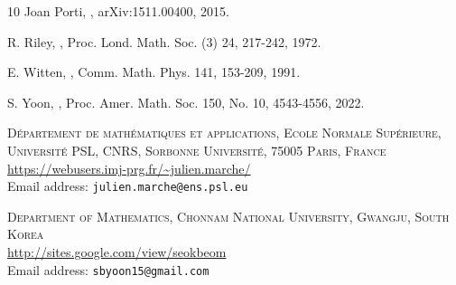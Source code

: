 \documentclass{amsart}
\theoremstyle{definition}
\begin{document}
\begin{thebibliography}{10}
Joan Porti,
,
\newblock arXiv:1511.00400, 2015.

R. Riley,
,
\newblock Proc. Lond. Math. Soc. (3) 24, 217-242, 1972.


E. Witten,
,
\newblock Comm. Math.  Phys. 141, 153-209, 1991.

S. Yoon, 
,
\newblock Proc. Amer. Math. Soc. 150, No. 10, 4543-4556, 2022.

\end{thebibliography}
{
\footnotesize
\bigskip
\noindent \textsc{D\'epartement de math\'ematiques et applications,
Ecole Normale Sup\'erieure, Université PSL, CNRS, Sorbonne Université,
75005 Paris, France}\\
\url{https://webusers.imj-prg.fr/~julien.marche/}\\
Email address: \texttt{julien.marche@ens.psl.eu}
\bigskip

\noindent \textsc{Department of Mathematics, Chonnam National University, Gwangju, South Korea}\\
\url{http://sites.google.com/view/seokbeom}\\
Email address: \texttt{sbyoon15@gmail.com}
}
\end{document}
